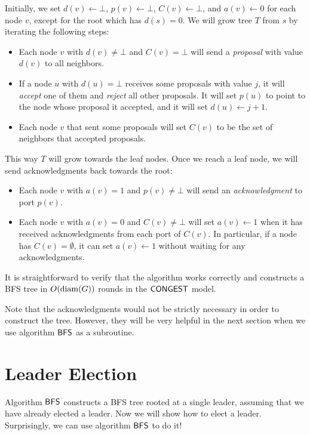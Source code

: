 Initially, we set $d(v) \gets \bot$, $p(v) \gets \bot$, $C(v) \gets \bot$, and $a(v) \gets 0$ for each node $v$, except for the root which has $d(s) = 0$. We will grow tree $T$ from $s$ by iterating the following steps:
\begin{itemize}
    \item Each node $v$ with $d(v) \ne \bot$ and $C(v) = \bot$ will send a \emph{proposal} with value $d(v)$ to all neighbors.
    \item If a node $u$ with $d(u) = \bot$ receives some proposals with value $j$, it will \emph{accept} one of them and \emph{reject} all other proposals. It will set $p(u)$ to point to the node whose proposal it accepted, and it will set $d(u) \gets j+1$.
    \item Each node $v$ that sent some proposals will set $C(v)$ to be the set of neighbors that accepted proposals.
\end{itemize}
This way $T$ will grow towards the leaf nodes. Once we reach a leaf node, we will send acknowledgments back towards the root:
\begin{itemize}
    \item Each node $v$ with $a(v) = 1$ and $p(v) \ne \bot$ will send an \emph{acknowledgment} to port $p(v)$.
    \item Each node $v$ with $a(v) = 0$ and $C(v) \ne \bot$ will set $a(v) \gets 1$ when it has received acknowledgments from each port of $C(v)$. In particular, if a node has $C(v) = \emptyset$, it can set $a(v) \gets 1$ without waiting for any acknowledgments.
\end{itemize}
It is straightforward to verify that the algorithm works correctly and constructs a BFS tree in $O(\operatorname{diam}(G))$ rounds in the $\textup{\sffamily CONGEST}$ model.

Note that the acknowledgments would not be strictly necessary in order to construct the tree. However, they will be very helpful in the next section when we use algorithm $\textup{\sffamily BFS}$ as a subroutine.


\section{Leader Election}\label{sec:leader}

Algorithm $\textup{\sffamily BFS}$ constructs a BFS tree rooted at a single leader, assuming that we have already elected a leader. Now we will show how to elect a leader. Surprisingly, we can use algorithm $\textup{\sffamily BFS}$ to do it!


